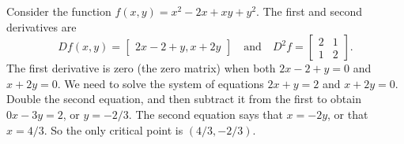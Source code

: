 \begin{example}
 Consider the function $f(x,y)=x^2-2x+xy+y^2$.  The first and second derivatives are $$Df(x,y)=\begin{bmatrix}2x-2+y,x+2y\end{bmatrix}
\quad\text{and}\quad 
 D^2f = \begin{bmatrix}2&1 \\1&2\end{bmatrix}.$$ 
The first derivative is zero (the zero matrix) when both $2x-2+y=0$ and $x+2y=0$. We need to solve the system of equations $2x+y=2$ and $x+2y=0$. Double the second equation, and then subtract it from the first to obtain $0x-3y=2$, or $y=-2/3$.  The second equation says that $x=-2y$, or that $x=4/3$.  So the only critical point is $(4/3,-2/3)$.
 
\end{example}
